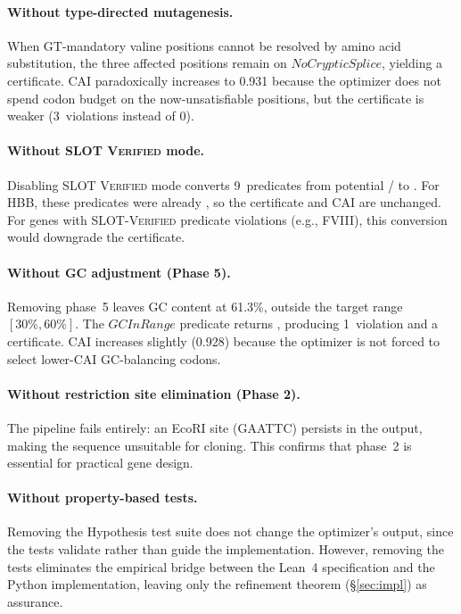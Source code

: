 \paragraph{Without type-directed mutagenesis.}
When GT-mandatory valine positions cannot be resolved by amino acid
substitution, the three affected positions remain \FAIL{} on
$\mathit{NoCrypticSplice}$, yielding a \BRONZE{} certificate.  CAI
paradoxically increases to 0.931 because the optimizer does not spend
codon budget on the now-unsatisfiable positions, but the certificate is
weaker (3~violations instead of 0).

\paragraph{Without SLOT \textsc{Verified} mode.}
Disabling SLOT \textsc{Verified} mode converts 9~predicates from
potential \PASS/\FAIL{} to \UNCERTAIN.  For HBB, these predicates were
already \PASS, so the certificate and CAI are unchanged.  For genes with
SLOT-\textsc{Verified} predicate violations (e.g., FVIII), this
conversion would downgrade the certificate.

\paragraph{Without GC adjustment (Phase 5).}
Removing phase~5 leaves GC content at 61.3\%, outside the target range
$[30\%, 60\%]$.  The $\mathit{GCInRange}$ predicate returns \FAIL,
producing 1~violation and a \BRONZE{} certificate.  CAI increases
slightly (0.928) because the optimizer is not forced to select
lower-CAI GC-balancing codons.

\paragraph{Without restriction site elimination (Phase 2).}
The pipeline fails entirely: an EcoRI site (GAATTC) persists in the
output, making the sequence unsuitable for cloning.  This confirms that
phase~2 is essential for practical gene design.

\paragraph{Without property-based tests.}
Removing the Hypothesis test suite does not change the optimizer's
output, since the tests validate rather than guide the implementation.
However, removing the tests eliminates the empirical bridge between the
Lean~4 specification and the Python implementation, leaving only the
refinement theorem (\S\ref{sec:impl}) as assurance.

